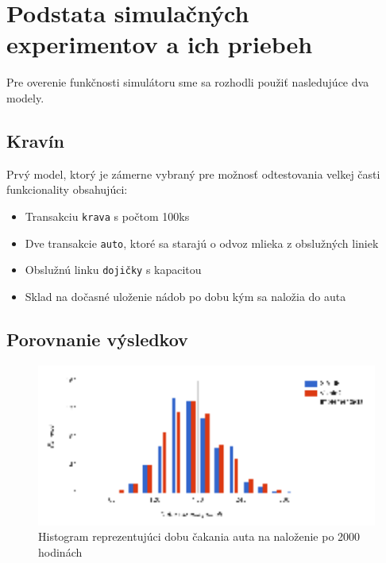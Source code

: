 \documentclass[11pt, a4paper, titlepage]{article}
\begin{document}
\section{Podstata simulačných experimentov a ich priebeh}
Pre overenie funkčnosti simulátoru sme sa rozhodli použiť nasledujúce dva modely.

%
\subsection{Kravín}

Prvý model\cite[slide 22]{demo1}, ktorý je zámerne vybraný pre možnosť odtestovania velkej časti funkcionality obsahujúci:
\begin{itemize}
    \item Transakciu \texttt{krava} s počtom 100ks
    \item Dve transakcie \texttt{auto}, ktoré sa starajú o odvoz mlieka z obslužných liniek
    \item Obslužnú linku \texttt{dojičky} s kapacitou
    \item Sklad na dočasné uloženie nádob po dobu kým sa naložia do auta
\end{itemize}

\subsection*{Porovnanie výsledkov}

\begin{figure}[h!]
    \includegraphics[width=12cm]{graf_kravin.eps}
    \centering
    \caption{Histogram reprezentujúci dobu čakania auta na naloženie po 2000 hodinách}
\end{figure}
\end{document}
